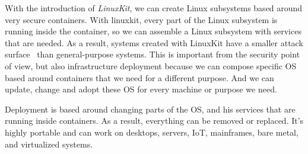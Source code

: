 \noindent
With the introduction of \textit{LinuxKit}, we can create Linux subsystems based around very secure containers. With linuxkit, every part of the Linux subsystem is running inside the container, so we can assemble a Linux subsystem with services that are needed. As a result, systems created with LinuxKit have a smaller attack surface~\cite{abs-1802-10375} than general-purpose systems. This is important from the security point of view, but also infrastructure deployment because we can compose specific OS based around containers that we need for a different purpose. And we can update, change and adopt these OS for every machine or purpose we need.

Deployment is based around changing parts of the OS, and his services that are running inside containers. As a result, everything can be removed or replaced. It's highly portable and can work on desktops, servers, IoT, mainframes, bare metal, and virtualized systems.
%
%
